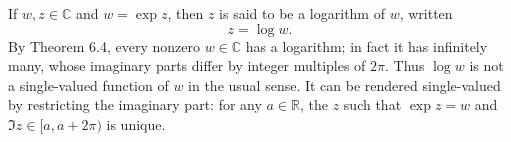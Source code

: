 If $w, z \in \mathbb{C}$ and $w = \exp z$, then $z$ is said to be a logarithm of $w$, written
$$
z = \log w.
$$
By Theorem 6.4, every nonzero $w \in \mathbb{C}$ has a logarithm; in fact it has infinitely many, whose imaginary parts differ by integer multiples of $2\pi$. Thus $\log w$ is not a single-valued function of $w$ in the usual sense. It can be rendered single-valued by restricting the imaginary part: for any $a \in \mathbb{R}$, the $z$ such that $\exp z = w$ and $\Im z \in [a, a + 2\pi)$ is unique.
